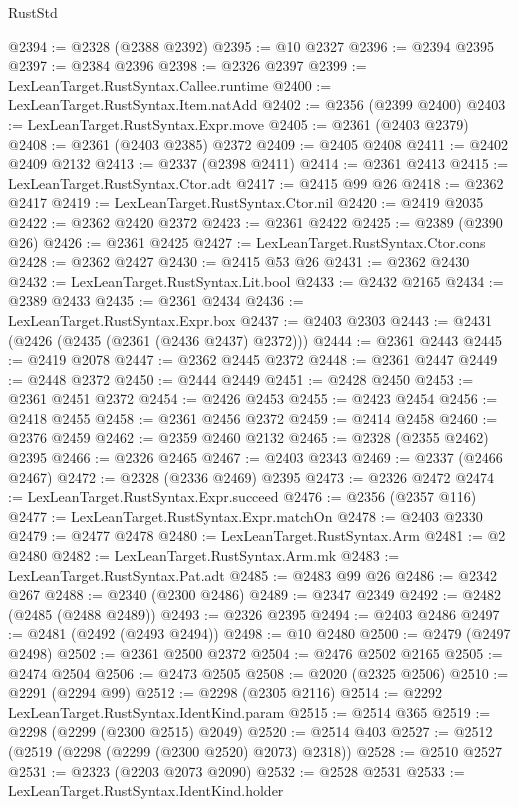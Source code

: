 \begin{lexlean}{RustStd}
\begin{coremodule}
{\begin{coremodule}
{{{{{{{{{{{{{{{{{{{{{{{{{{{{{{{{{{{{{@2394 := @2328 (@2388 @2392)
@2395 := @10 @2327
@2396 := @2394 @2395
@2397 := @2384 @2396
@2398 := @2326 @2397
@2399 := LexLeanTarget.RustSyntax.Callee.runtime
@2400 := LexLeanTarget.RustSyntax.Item.natAdd
@2402 := @2356 (@2399 @2400)
@2403 := LexLeanTarget.RustSyntax.Expr.move
@2405 := @2361 (@2403 @2379)
@2408 := @2361 (@2403 @2385) @2372
@2409 := @2405 @2408
@2411 := @2402 @2409 @2132
@2413 := @2337 (@2398 @2411)
@2414 := @2361 @2413
@2415 := LexLeanTarget.RustSyntax.Ctor.adt
@2417 := @2415 @99 @26
@2418 := @2362 @2417
@2419 := LexLeanTarget.RustSyntax.Ctor.nil
@2420 := @2419 @2035
@2422 := @2362 @2420 @2372
@2423 := @2361 @2422
@2425 := @2389 (@2390 @26)
@2426 := @2361 @2425
@2427 := LexLeanTarget.RustSyntax.Ctor.cons
@2428 := @2362 @2427
@2430 := @2415 @53 @26
@2431 := @2362 @2430
@2432 := LexLeanTarget.RustSyntax.Lit.bool
@2433 := @2432 @2165
@2434 := @2389 @2433
@2435 := @2361 @2434
@2436 := LexLeanTarget.RustSyntax.Expr.box
@2437 := @2403 @2303
@2443 := @2431 (@2426 (@2435 (@2361 (@2436 @2437) @2372)))
@2444 := @2361 @2443
@2445 := @2419 @2078
@2447 := @2362 @2445 @2372
@2448 := @2361 @2447
@2449 := @2448 @2372
@2450 := @2444 @2449
@2451 := @2428 @2450
@2453 := @2361 @2451 @2372
@2454 := @2426 @2453
@2455 := @2423 @2454
@2456 := @2418 @2455
@2458 := @2361 @2456 @2372
@2459 := @2414 @2458
@2460 := @2376 @2459
@2462 := @2359 @2460 @2132
@2465 := @2328 (@2355 @2462) @2395
@2466 := @2326 @2465
@2467 := @2403 @2343
@2469 := @2337 (@2466 @2467)
@2472 := @2328 (@2336 @2469) @2395
@2473 := @2326 @2472
@2474 := LexLeanTarget.RustSyntax.Expr.succeed
@2476 := @2356 (@2357 @116)
@2477 := LexLeanTarget.RustSyntax.Expr.matchOn
@2478 := @2403 @2330
@2479 := @2477 @2478
@2480 := LexLeanTarget.RustSyntax.Arm
@2481 := @2 @2480
@2482 := LexLeanTarget.RustSyntax.Arm.mk
@2483 := LexLeanTarget.RustSyntax.Pat.adt
@2485 := @2483 @99 @26
@2486 := @2342 @267
@2488 := @2340 (@2300 @2486)
@2489 := @2347 @2349
@2492 := @2482 (@2485 (@2488 @2489))
@2493 := @2326 @2395
@2494 := @2403 @2486
@2497 := @2481 (@2492 (@2493 @2494))
@2498 := @10 @2480
@2500 := @2479 (@2497 @2498)
@2502 := @2361 @2500 @2372
@2504 := @2476 @2502 @2165
@2505 := @2474 @2504
@2506 := @2473 @2505
@2508 := @2020 (@2325 @2506)
@2510 := @2291 (@2294 @99)
@2512 := @2298 (@2305 @2116)
@2514 := @2292 LexLeanTarget.RustSyntax.IdentKind.param
@2515 := @2514 @365
@2519 := @2298 (@2299 (@2300 @2515) @2049)
@2520 := @2514 @403
@2527 := @2512 (@2519 (@2298 (@2299 (@2300 @2520) @2073) @2318))
@2528 := @2510 @2527
@2531 := @2323 (@2203 @2073 @2090)
@2532 := @2528 @2531
@2533 := LexLeanTarget.RustSyntax.IdentKind.holder
}}}}}}}}}}}}}}}}}}}}}}}}}}}}}}}}}}}}}
\end{coremodule}}
\end{coremodule}
\end{lexlean}
